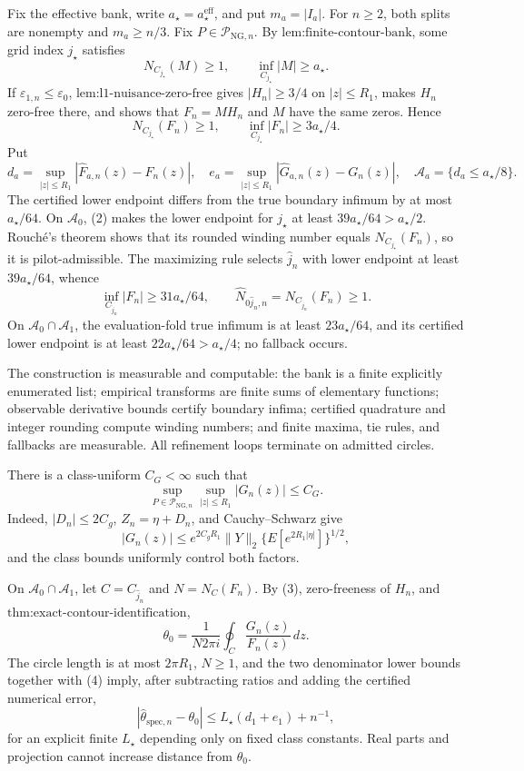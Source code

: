Fix the effective bank, write \(a_{\star}=a_{\star}^{\mathrm{eff}}\), and put \(m_a=|I_a|\).  For \(n\ge2\), both splits are nonempty and \(m_a\ge n/3\).  Fix \(P\in\mathcal P_{\mathrm{NG},n}\).  By \(\text{lem:finite-contour-bank}\), some grid index \(j_{\star}\) satisfies
\[
 N_{C_{j_{\star}}}(M)\ge1,\qquad \inf_{C_{j_{\star}}}|M|\ge a_{\star}. \tag{1}
\]
If \(\varepsilon_{1,n}\le\varepsilon_0\), \(\text{lem:l1-nuisance-zero-free}\) gives \(|H_n|\ge3/4\) on \(|z|\le R_1\), makes \(H_n\) zero-free there, and shows that \(F_n=MH_n\) and \(M\) have the same zeros.  Hence
\[
 N_{C_{j_{\star}}}(F_n)\ge1,\qquad \inf_{C_{j_{\star}}}|F_n|\ge3a_{\star}/4. \tag{2}
\]
Put
\[
 d_a=\sup_{|z|\le R_1}|\widehat F_{a,n}(z)-F_n(z)|,\quad
 e_a=\sup_{|z|\le R_1}|\widehat G_{a,n}(z)-G_n(z)|,\quad
 \mathcal A_a=\{d_a\le a_{\star}/8\}.
\]
The certified lower endpoint differs from the true boundary infimum by at most \(a_{\star}/64\).  On \(\mathcal A_0\), (2) makes the lower endpoint for \(j_{\star}\) at least \(39a_{\star}/64>a_{\star}/2\).  Rouch\'e's theorem shows that its rounded winding number equals \(N_{C_{j_{\star}}}(F_n)\), so it is pilot-admissible.  The maximizing rule selects \(\widehat j_n\) with lower endpoint at least \(39a_{\star}/64\), whence
\[
 \inf_{C_{\widehat j_n}}|F_n|\ge31a_{\star}/64,\qquad
 \widehat N_{0\widehat j_n,n}=N_{C_{\widehat j_n}}(F_n)\ge1. \tag{3}
\]
On \(\mathcal A_0\cap\mathcal A_1\), the evaluation-fold true infimum is at least \(23a_{\star}/64\), and its certified lower endpoint is at least \(22a_{\star}/64>a_{\star}/4\); no fallback occurs.

The construction is measurable and computable: the bank is a finite explicitly enumerated list; empirical transforms are finite sums of elementary functions; observable derivative bounds certify boundary infima; certified quadrature and integer rounding compute winding numbers; and finite maxima, tie rules, and fallbacks are measurable.  All refinement loops terminate on admitted circles.

There is a class-uniform \(C_G<\infty\) such that
\[
 \sup_{P\in\mathcal P_{\mathrm{NG},n}}\sup_{|z|\le R_1}|G_n(z)|\le C_G. \tag{4}
\]
Indeed, \(|D_n|\le2C_g\), \(Z_n=\eta+D_n\), and Cauchy--Schwarz give
\[
 |G_n(z)|\le e^{2C_gR_1}\|Y\|_2\{E[e^{2R_1|\eta|}]\}^{1/2},
\]
and the class bounds uniformly control both factors.

On \(\mathcal A_0\cap\mathcal A_1\), let \(C=C_{\widehat j_n}\) and \(N=N_C(F_n)\).  By (3), zero-freeness of \(H_n\), and \(\text{thm:exact-contour-identification}\),
\[
 \theta_0=\frac1{N2\pi i}\oint_C\frac{G_n(z)}{F_n(z)}\,dz.
\]
The circle length is at most \(2\pi R_1\), \(N\ge1\), and the two denominator lower bounds together with (4) imply, after subtracting ratios and adding the certified numerical error,
\[
 |\widehat\theta_{\mathrm{spec},n}-\theta_0|
 \le L_{\star}(d_1+e_1)+n^{-1}, \tag{5}
\]
for an explicit finite \(L_{\star}\) depending only on fixed class constants.  Real parts and projection cannot increase distance from \(\theta_0\).

